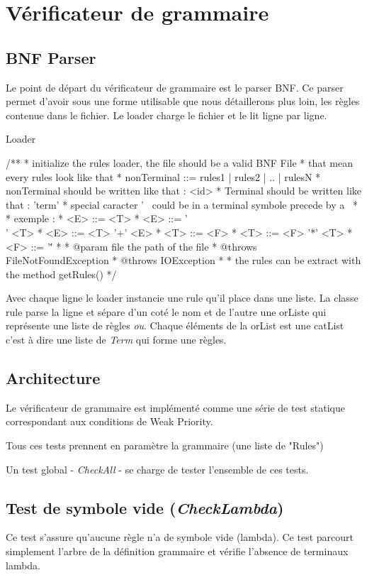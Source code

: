 \section{Vérificateur de grammaire}
	\subsection{BNF Parser}
	Le point de départ du vérificateur de grammaire est le parser BNF. Ce parser permet d'avoir sous une forme utilisable que nous détaillerons 
plus loin, les règles contenue dans le fichier. Le loader charge le fichier et le lit ligne par ligne.

Loader
\begin{verbatim*}
	/**
	 * initialize the rules loader, the file should be a valid BNF File
	 * that mean every rules look like that
	 * nonTerminal ::= rules1 | rules2 | .. | rulesN
	 * nonTerminal should be written like that : <id>
	 * Terminal should be written like that : 'term'
	 * special caracter  ' \ could be in a terminal symbole precede by a \
	 * 
	 * exemple : 
	 * <E> ::= <T> 
	 * <E> ::= '\\' <T> 
	 * <E> ::= <T> '+' <E>
	 * <T> ::= <F>
	 * <T> ::= <F> '*' <T> 
	 * <F> ::= '\''
	 *  
	 * @param file the path of the file
	 * @throws FileNotFoundException
	 * @throws IOException
	 * 
	 * the rules can be extract with the method getRules()
	 */
\end{verbatim*}

Avec chaque ligne le loader instancie une rule qu'il place dans une liste. La classe rule parse la ligne et sépare d'un coté le nom et de l'autre
une orListe qui représente une liste de règles \textit{ou}. Chaque éléments de la orList est une catList c'est à dire une liste de \textit{Term} qui forme une règles.

	\subsection{Architecture}
	Le vérificateur de grammaire est implémenté comme une série de test
	statique correspondant aux conditions de Weak Priority.
	
	Tous ces tests prennent en paramètre la grammaire (une liste de "Rules")

	Un test global - \emph{CheckAll} - se charge de tester l'ensemble de ces tests.


	\subsection{Test de symbole vide (\emph{CheckLambda})}
		Ce test s'assure qu'aucune règle n'a de symbole vide (lambda).
		Ce test parcourt simplement l'arbre de la définition grammaire et
		vérifie l'absence de terminaux lambda.
